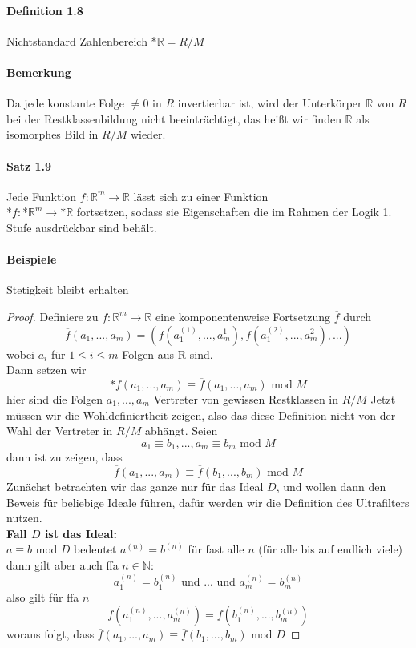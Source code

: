 \documentclass[a4paper]{article}
\begin{document}
\paragraph{Definition 1.8} Nichtstandard Zahlenbereich *$\mathbb{R} = R/M $

\paragraph{Bemerkung} Da jede konstante Folge $ \neq 0 $ in $ R $ invertierbar ist,
wird der Unterkörper $ \mathbb{R} $ von $ R $ bei der Restklassenbildung nicht beeinträchtigt, das heißt
wir finden $ \mathbb{R} $ als isomorphes Bild in $ R/M $ wieder.

\paragraph{Satz 1.9} 
Jede Funktion $f:\mathbb{R}^m \to \mathbb{R} $ lässt sich zu einer 
Funktion \\*$f:$*$\mathbb{R}^m \to \text{*}\mathbb{R}$ fortsetzen, sodass sie Eigenschaften die im Rahmen 
der Logik 1. Stufe ausdrückbar sind behält.
\paragraph{Beispiele} Stetigkeit bleibt erhalten
\begin{proof}
      Definiere zu $f:\mathbb{R}^m \to \mathbb{R} $ eine komponentenweise Fortsetzung $ \overline{f} $ durch
      $$ \overline{f}(a_1,...,a_m) = (f(a^{(1)}_1,...,a^{1}_m), f(a^{(2)}_1,...,a^{2}_m),...) $$
      wobei $ a_i $ für $ 1 \leqslant i \leqslant m $ Folgen aus R sind. \\
      Dann setzen wir 
      $$ \text{*}f(a_1,...,a_m) \equiv \overline{f}(a_1,...,a_m) \text{ mod } M $$
      hier sind die Folgen $ a_1,...,a_m $ Vertreter von gewissen Restklassen in $ R/M $
      Jetzt müssen wir die Wohldefiniertheit zeigen, also das diese Definition nicht von der Wahl 
      der Vertreter in $ R/M $ abhängt. Seien 
      $$ a_1 \equiv b_1,...,a_m \equiv b_m \text{ mod } M $$ 
      dann ist zu zeigen, dass
      $$ \overline{f}(a_1,...,a_m) \equiv \overline{f}(b_1,...,b_m) \text{ mod } M $$
      Zunächst betrachten wir das ganze nur für das Ideal $ D $, und wollen dann den Beweis für beliebige Ideale führen,
      dafür werden wir die Definition des Ultrafilters nutzen. \\
      

      \textbf{Fall $ D $ ist das Ideal:} \\
      $ a \equiv b \text{ mod } D $ bedeutet $ a^{(n)} = b^{(n)} $ für fast alle $ n $ (für alle bis auf endlich viele)
      dann gilt aber auch ffa $ n \in \mathbb{N} $:
      $$ a^{(n)}_1 = b^{(n)}_1 \text{ und }...\text{ und } a^{(n)}_m = b^{(n)}_m $$ 
      also gilt für ffa $ n $ 
      $$  f(a^{(n)}_1,...,a^{(n)}_m) = f(b^{(n)}_1,...,b^{(n)}_m) $$
      woraus folgt, dass $ \overline{f}(a_1,...,a_m) \equiv \overline{f}(b_1,...,b_m) \text{ mod } D $

\end{proof}
\end{document}
